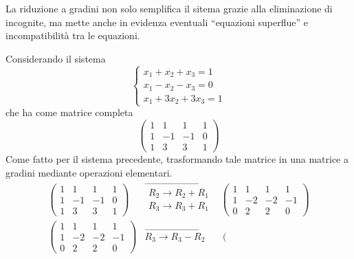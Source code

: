 La riduzione a gradini non solo semplifica il sitema grazie alla
eliminazione di incognite, ma mette anche in evidenza eventuali
``equazioni superflue'' e incompatibilità tra le equazioni.
\begin{es}
  \label{es:gauss-jorda2}
  Considerando il sistema
  \begin{equation}
    \label{eq:gauss-jorda2-1}
    \begin{cases}
      x_1+x_2+x_3=1\\
      x_1-x_2-x_3=0\\
      x_1+3x_2+3x_3=1
    \end{cases}
  \end{equation}
  che ha come matrice completa
  \begin{equation}
    \label{eq:gauss-jorda2-2}
    \left(\begin{array}{ccc|c}
      1 & 1 & 1 & 1   \\
      1 & -1 & -1 & 0 \\
      1 & 3 & 3 & 1
    \end{array}\right)
  \end{equation}
  Come fatto per il sistema precedente, trasformando tale matrice in una
  matrice a gradini mediante operazioni elementari.
  \begin{eqnarray*}
    \left(\begin{array}{ccc|c}
      1 & 1 & 1 & 1   \\
      1 & -1 & -1 & 0 \\
      1 & 3 & 3 & 1
    \end{array}\right)& \overrightarrow{
        \begin{matrix}
          R_2\to R_2+R_1\\
          R_3\to R_3+R_1
        \end{matrix}
      }& \left(\begin{array}{ccc|c}
        1 & 1 & 1 & 1   \\
        1 & -2 & -2 & -1 \\
        0 & 2 & 2 & 0
      \end{array}\right)\\
    \left(\begin{array}{ccc|c}
        1 & 1 & 1 & 1   \\
        1 & -2 & -2 & -1 \\
        0 & 2 & 2 & 0
      \end{array}\right) & \overrightarrow{
                             R_3\to R_3-R_2} &
                              \left(\begin{array}{ccc|c}

\end{array}
\end{eqnarray*}
\end{es}
